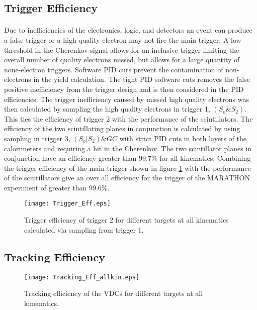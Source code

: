 \subsection{Trigger Efficiency}
\paragraph{}  Due to inefficiencies of the electronics, logic, and detectors an event can produce a false trigger or a high quality electron may not fire the main trigger.
A low threshold in the Cherenkov signal allows for an inclusive trigger limiting the overall number of quality electrons missed, but allows for a large quantity of none-electron triggers. Software PID cuts prevent the contamination of non-electrons in the yield calculation. The tight PID software cuts removes the false positive inefficiency from the trigger design and is then considered in the PID efficiencies. The trigger inefficiency caused by missed high quality electrons was then calculated by sampling the high quality electrons in trigger 1, $(S_o \& S_2)$. This ties the efficiency of trigger 2 with the performance of the scintillators. The efficiency of the two scintillating planes in conjunction is calculated by using sampling in trigger 3, $(S_o | S_2) \& GC$ with strict PID cuts in both layers of the calorimeters and requiring a hit in the Cherenkov. The two scintillator planes in conjunction have an efficiency greater than $99.7 \% $ for all kinematics. Combining the trigger efficiency of the main trigger shown in figure \ref{trigeff} with the performance of the scintillators give an over all efficiency for the trigger of the MARATHON experiment of greater than $99.6\%$.
\begin{figure}[]
	\centering

	\texttt{[image: Trigger\_Eff.eps]}
	
	\caption{Trigger efficiency of trigger 2 for different targets at all kinematics calculated via sampling from trigger 1. }
	\label{trigeff}
\end{figure}
\subsection{Tracking Efficiency}\label{eff_track}
\begin{figure}[]
	\centering

	\texttt{[image: Tracking\_Eff\_allkin.eps]}
	
	\caption{Tracking efficiency of the VDCs for different targets at all kinematics. }
	\label{trackeff}
\end{figure}
